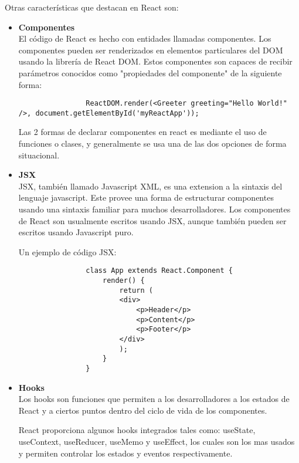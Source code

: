Otras características que destacan en React son:\\

\begin{itemize}
  \item \textbf{Componentes} \hfill \\

        El código de React es hecho con entidades llamadas componentes. Los componentes pueden ser renderizados en elementos particulares del DOM usando la librería de React DOM. Estos componentes son capaces de recibir parámetros conocidos como "propiedades del componente" de la siguiente forma: \hfill \\

        \begin{lstlisting}
                ReactDOM.render(<Greeter greeting="Hello World!" />, document.getElementById('myReactApp'));
            \end{lstlisting}

        Las 2 formas de declarar componentes en react es mediante el uso de funciones o clases, y generalmente se usa una de las dos opciones de forma situacional.

  \item \textbf{JSX} \hfill \\

        JSX, también llamado Javascript XML, es una extension a la sintaxis del lenguaje javascript. Este provee una forma de estructurar componentes usando una sintaxis familiar para muchos desarrolladores. Los componentes de React son usualmente escritos usando JSX, aunque también pueden ser escritos usando Javascript puro.

        Un ejemplo de código JSX:

        \begin{lstlisting}
                class App extends React.Component {
                    render() {
                        return (
                        <div>
                            <p>Header</p>
                            <p>Content</p>
                            <p>Footer</p>
                        </div>
                        );
                    }
                }
            \end{lstlisting}

  \item \textbf{Hooks} \hfill \\

        Los hooks son funciones que permiten a los desarrolladores  a los estados de React y a ciertos puntos dentro del ciclo de vida de los componentes.

        React proporciona algunos hooks integrados tales como: useState, useContext, useReducer, useMemo y useEffect, los cuales son los mas usados y permiten controlar los estados y eventos respectivamente.


\end{itemize}

